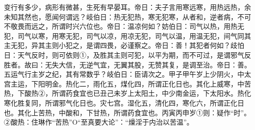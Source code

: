\documentclass[a4paper,12pt,UTF8,twoside]{ctexbook}
\begin{document}
变行有多少，病形有微甚，生死有早晏耳。帝日：夫子言用寒远寒，用热远热，余未知其然也，愿闻何谓远？岐伯日：热无犯热，寒无犯寒，从者和，逆者病，不可不敬畏而远之，所谓时兴六位也。帝日：温凉何如？妨伯日：司气以热，用热无犯，司气以寒，用寒无犯，司气以凉，用凉无犯，司气以温，用温无犯，间气同其主无犯，异其主则小犯之，是谓四畏，必谨察之。帝日：善！其犯者何如？歧怕日：天气反时，则可依则①，及胜其主则可犯，以平为期，而不可过，是谓邪气反胜者。故曰：无失大信，无逆气宜，无翼其股，无赞其复，是调至治。帝日：善。五运气行主岁之纪，其有常数乎？岐伯日：臣请次之。甲子甲午岁上少阴火，中太宫主运，下阳明金。热化二，雨化五，煤化四，所谓正化日也。其化上威寒，中苦热，下酸热②，所谓药食宜也已丑己未岁上太阳土，中少南金运，下太阳水。热化寒化胜复同，所谓邪气化日也。灾七宫。湿化五，清化四，寒化六，所谓正化日也。其化上苦热，中酸和，下甘热，所谓药食宜也。丙寅丙申岁①则：疑作“时”。②酸热：住琳作“苦热”O“至真要大论”：“燥淫于内治以苦温”。
\end{document}
